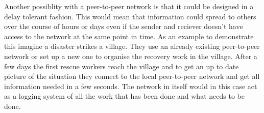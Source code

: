 Another possiblity with a peer-to-peer network is that it could be designed in a delay tolerant fashion.
This would mean that information could spread to others over the course of hours or days even if the sender and reciever doesn't have access to the network at the same point in time.
As an example to demonstrate this imagine a disaster strikes a village.
They use an already existing peer-to-peer network or set up a new one to organise the recovery work in the village.
After a few days the first rescue workers reach the village and to get an up to date picture of the situation they connect to the local peer-to-peer network and get all information needed in a few seconds. 
The network in itself would in this case act as a logging system of all the work that has been done and what needs to be done.


